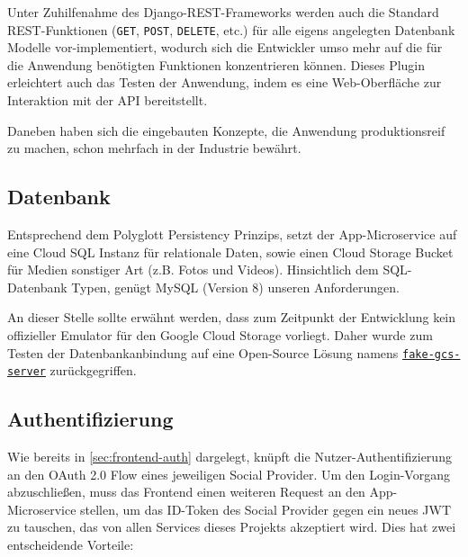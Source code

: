 \documentclass{article}
\begin{document}
Unter Zuhilfenahme des Django-REST-Frameworks werden auch die Standard REST-Funktionen (\texttt{GET}, \texttt{POST}, \texttt{DELETE}, etc.) für alle eigens angelegten Datenbank Modelle vor-implementiert, wodurch sich die Entwickler umso mehr auf die für die Anwendung benötigten Funktionen konzentrieren können. Dieses Plugin erleichtert auch das Testen der Anwendung, indem es eine Web-Oberfläche zur Interaktion mit der API bereitstellt. 

Daneben haben sich die eingebauten Konzepte, die Anwendung produktionsreif zu machen, schon mehrfach in der Industrie bewährt. 


\subsection{Datenbank}
\label{sec:app-database}

Entsprechend dem Polyglott Persistency Prinzips, setzt der App-Microservice auf eine Cloud SQL Instanz für relationale Daten, sowie einen Cloud Storage Bucket für Medien sonstiger Art (z.B. Fotos und Videos). Hinsichtlich dem SQL-Datenbank Typen, genügt MySQL (Version 8) unseren Anforderungen. 

An dieser Stelle sollte erwähnt werden, dass zum Zeitpunkt der Entwicklung kein offizieller Emulator für den Google Cloud Storage vorliegt. Daher wurde zum Testen der Datenbankanbindung auf eine Open-Source Lösung namens \href{https://github.com/fsouza/fake-gcs-server}{\texttt{fake-gcs-server}} zurückgegriffen. 


\subsection{Authentifizierung}
\label{sec:app-backend-auth}

Wie bereits in \autoref{sec:frontend-auth} dargelegt, knüpft die Nutzer-Authentifizierung an den OAuth 2.0 Flow eines jeweiligen Social Provider. Um den Login-Vorgang abzuschließen, muss das Frontend einen weiteren Request an den App-Microser\-vice stellen, um das ID-Token des Social Provider gegen ein neues JWT zu tauschen, das von allen Services dieses Projekts akzeptiert wird. Dies hat zwei entscheidende Vorteile:
\end{document}
